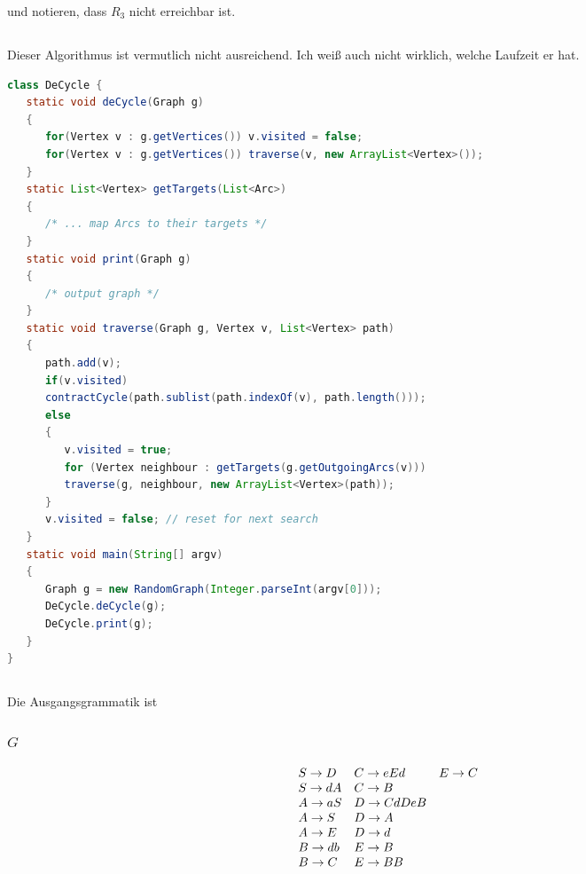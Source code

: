 \documentclass{article}
\begin{document}
und notieren, dass $R_3$ nicht erreichbar ist.

\subsection{} 


Dieser Algorithmus ist vermutlich nicht ausreichend. Ich weiß auch nicht
wirklich, welche Laufzeit er hat.
\begin{lstlisting}[language=Java]
class DeCycle {
   static void deCycle(Graph g)
   {
      for(Vertex v : g.getVertices()) v.visited = false;
      for(Vertex v : g.getVertices()) traverse(v, new ArrayList<Vertex>());
   }
   static List<Vertex> getTargets(List<Arc>)
   {
      /* ... map Arcs to their targets */
   }
   static void print(Graph g)
   {
      /* output graph */
   }
   static void traverse(Graph g, Vertex v, List<Vertex> path)
   {
      path.add(v);
      if(v.visited) 
      contractCycle(path.sublist(path.indexOf(v), path.length()));
      else
      {
         v.visited = true;
         for (Vertex neighbour : getTargets(g.getOutgoingArcs(v)))
         traverse(g, neighbour, new ArrayList<Vertex>(path));
      }
      v.visited = false; // reset for next search
   }
   static void main(String[] argv)
   {
      Graph g = new RandomGraph(Integer.parseInt(argv[0]));
      DeCycle.deCycle(g);
      DeCycle.print(g);
   }
}
\end{lstlisting}

\subsection{} 

Die Ausgangsgrammatik ist

\subsubsection{$G$}
\begin{align*}
\begin{array}{lll}
   S \rightarrow D & C \rightarrow eEd & E \rightarrow C \\
   S \rightarrow dA & C \rightarrow B \\
   A \rightarrow aS & D \rightarrow CdDeB \\
   A \rightarrow S & D \rightarrow A \\
   A \rightarrow E & D \rightarrow d \\
   B \rightarrow db & E \rightarrow B \\
   B \rightarrow C & E \rightarrow BB
\end{array}
\end{align*}
\end{document}
